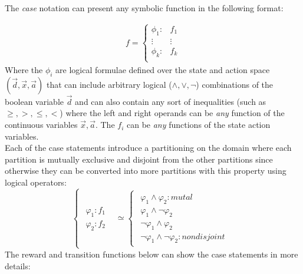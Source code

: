 \documentclass[letterpaper]{article}
\renewcommand{\-}{\text{-}}
\begin{document}
The \textit{case} notation can present any symbolic function in the following format: 

{%
\begin{equation}
\begin{align*}
f = 
\begin{cases}
  \phi_1: & f_1 \\ 
 \vdots&\vdots\\ 
  \phi_k: & f_k \\ 
\end{cases}
\end{align*}
\end{equation}
}
Where the $\phi_i$ are logical formulae defined over the state and action space $(\vec{d},\vec{x},\vec{a})$ that can include arbitrary logical ($\land,\lor,\neg$) combinations of the boolean variable $\vec{d}$ and can also contain any sort of
inequalities (such as $\geq,>,\leq,<$) where the left and right operands can be \emph{any} function of the continuous variables $\vec{x},\vec{a}$. 
The $f_i$ can be \emph{any} functions of the state action variables.  
\\
Each of the case statements introduce a partitioning on the domain where each partition is mutually exclusive and disjoint from the other partitions since otherwise they can be converted into more partitions with this property using logical operators: 
{%
\[
\begin{cases}
\begin{array}{c}
\varphi_{1}:f_{1}\\
\varphi_{2}:f_{2}
\end{array} & \simeq\begin{cases}
\begin{array}{c}
\varphi_{1}\wedge\varphi_{2}:mutal\\
\varphi_{1}\wedge\neg\varphi_{2}\\
\neg\varphi_{1}\wedge\varphi_{2}\\
\neg\varphi_{1}\wedge\neg\varphi_{2}:nondisjoint
\end{array}\end{cases}\end{cases}
\]
}
The reward and transition functions below can show the case statements in more details:\\
\end{document}
